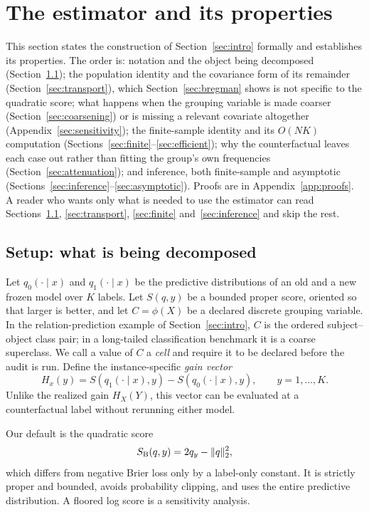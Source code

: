 \section{The estimator and its properties}\label{sec:method}

This section states the construction of Section~\ref{sec:intro} formally and establishes its properties. The order is: notation and the object being
decomposed (Section~\ref{sec:setup}); the population identity and the covariance form of
its remainder (Section~\ref{sec:transport}), which Section~\ref{sec:bregman} shows is not
specific to the quadratic score; what happens when the grouping variable is made coarser
(Section~\ref{sec:coarsening}) or is missing a relevant covariate altogether
(Appendix~\ref{sec:sensitivity}); the finite-sample identity and its $O(NK)$ computation
(Sections~\ref{sec:finite}--\ref{sec:efficient}); why the counterfactual leaves each case
out rather than fitting the group's own frequencies (Section~\ref{sec:attenuation}); and
inference, both finite-sample and asymptotic
(Sections~\ref{sec:inference}--\ref{sec:asymptotic}). Proofs are in Appendix~\ref{app:proofs}. A reader who wants only what is needed to use the estimator can
read Sections~\ref{sec:setup}, \ref{sec:transport}, \ref{sec:finite}
and~\ref{sec:inference} and skip the rest.

\subsection{Setup: what is being decomposed}\label{sec:setup}

Let $q_0(\cdot\mid x)$ and $q_1(\cdot\mid x)$ be the predictive distributions of an
old and a new frozen model over $K$ labels. Let $S(q,y)$ be a bounded proper score,
oriented so that larger is better, and let $C=\phi(X)$ be a declared discrete
grouping variable. In the relation-prediction example of Section~\ref{sec:intro}, $C$ is the ordered
subject--object class pair; in a long-tailed classification benchmark it is a coarse
superclass. We call a value of $C$ a \emph{cell} and require it to be declared before the
audit is run. Define the
instance-specific \emph{gain vector}
\begin{equation}
H_x(y)=S(q_1(\cdot\mid x),y)-S(q_0(\cdot\mid x),y),\qquad y=1,\ldots,K.
\label{eq:gain-vector}
\end{equation}
Unlike the realized gain $H_X(Y)$, this vector can be evaluated at a counterfactual
label without rerunning either model.

Our default is the quadratic score
\begin{equation}
S_{\rm B}(q,y)=2q_y-\lVert q\rVert_2^2,
\label{eq:brier}
\end{equation}
which differs from negative Brier loss only by a label-only constant. It is strictly
proper and bounded, avoids probability clipping, and uses the entire predictive
distribution. A floored log score is a sensitivity analysis.

